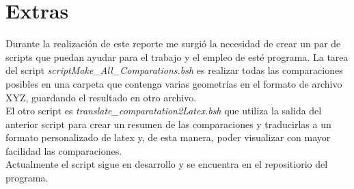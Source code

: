 \documentclass[12pt]{article}
\begin{document}





\section{Extras}

Durante la realización de este reporte me surgió la necesidad de crear un par de scripts que puedan ayudar para el trabajo y 
el empleo de esté programa. La tarea del script {\it scriptMake\_All\_Comparations.bsh} es realizar todas las comparaciones 
posibles en una carpeta que contenga varias geometrías en el formato de archivo XYZ, guardando el resultado en otro archivo.\\
El otro script es {\it translate\_comparatation2Latex.bsh} que utiliza la salida del anterior script para crear un resumen de las comparaciones 
y traducirlas a un formato personalizado de latex y, de esta manera, poder visualizar con mayor facilidad las comparaciones.\\
Actualmente el script sigue en desarrollo y se encuentra en el repositiorio del programa.
\end{document}
